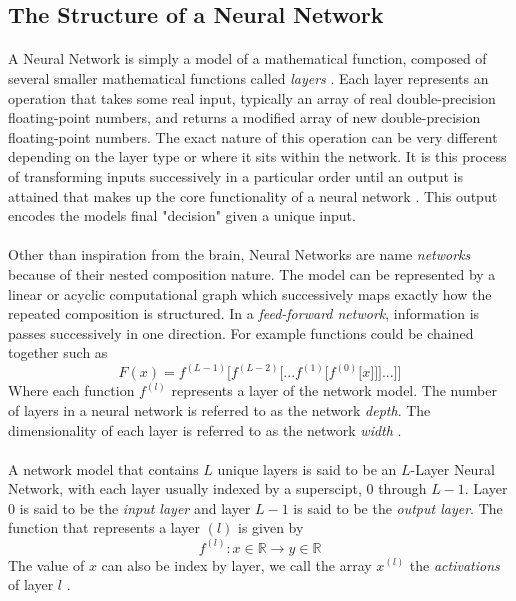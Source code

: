 \documentclass[12pt,letterpaper]{article}
\begin{document}

\subsection{The Structure of a Neural Network}
\label{subsec-NetworkStructre}

\paragraph*{}A Neural Network is simply a model of a mathematical function, composed of several smaller mathematical functions called \textit{layers} \cite{Goodfellow,Loy}. Each layer represents an operation that takes some real input, typically an array of real double-precision floating-point numbers, and returns a modified array of new double-precision floating-point numbers. The exact nature of this operation can be very different depending on the layer type or where it sits within the network. It is this process of transforming inputs successively in a particular order until an output is attained that makes up the core functionality of a neural network \cite{Geron,Loy}. This output encodes the models final "decision" given a unique input.

\paragraph*{}Other than inspiration from the brain, Neural Networks are name \textit{networks} because of their nested composition nature. The model can be represented by a linear or acyclic computational graph which successively maps exactly how the repeated composition is structured. In a \textit{feed-forward network}, information is passes successively in one direction. For example functions could be chained together such as \cite{Goodfellow}
\begin{equation}
\label{eqn-FunctionChain}
F(x) = f^{(L-1)}\big[f^{(L-2)}\big[...f^{(1)}\big[f^{(0)}\big[x]\big]\big]...\big]\big]
\end{equation}
Where each function $f^{(l)}$ represents a layer of the network model. The number of layers in a neural network is referred to as the network \textit{depth}. The dimensionality of each layer is referred to as the network \textit{width} \cite{Geron,Loy}.

\paragraph*{}A network model that contains $L$ unique layers is said to be an $L$-Layer Neural Network, with each layer usually indexed by a superscipt, $0$ through $L-1$. Layer $0$ is said to be the \textit{input layer} and layer $L-1$ is said to be the \textit{output layer}. The function that represents a layer $(l)$ is given by 
\begin{equation}
\label{eqn-LayerFunction}
f^{(l)} : x \in \mathbb{R} \rightarrow y \in \mathbb{R}
\end{equation}
The value of $x$ can also be index by layer, we call the array $x^{(l)}$ the \textit{activations} of layer $l$ \cite{Goodfellow,Loy}. 
\end{document}
